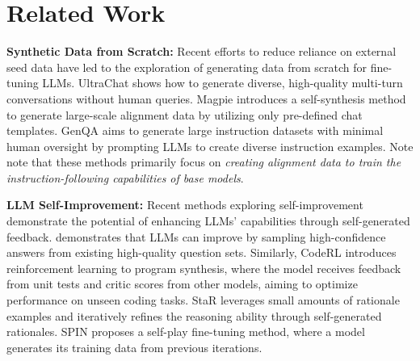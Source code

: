 \section{Related Work}\label{sec:related-work}

\textbf{Synthetic Data from Scratch:} Recent efforts to reduce reliance on external seed data have led to the exploration of generating data from scratch for fine-tuning LLMs. UltraChat \cite{DBLP:conf/emnlp/DingCXQHL0Z23} shows how to generate diverse, high-quality multi-turn conversations without human queries. Magpie \cite{DBLP:journals/corr/abs-2406-08464} introduces a self-synthesis method to generate large-scale alignment data by utilizing only pre-defined chat templates. GenQA \cite{DBLP:journals/corr/abs-2406-10323} aims to generate large instruction datasets with minimal human oversight by prompting LLMs to create diverse instruction examples. Note note that these methods primarily focus on \emph{creating alignment data to train the instruction-following capabilities of base models}.

\textbf{LLM Self-Improvement:} Recent methods exploring self-improvement demonstrate the potential of enhancing LLMs' capabilities through self-generated feedback. \citep{DBLP:conf/emnlp/0001GHW00023} demonstrates that LLMs can improve by sampling high-confidence answers from existing high-quality question sets. Similarly, CodeRL \cite{DBLP:conf/nips/Le0GSH22} introduces reinforcement learning to program synthesis, where the model receives feedback from unit tests and critic scores from other models, aiming to optimize performance on unseen coding tasks. StaR \cite{DBLP:conf/nips/ZelikmanWMG22} leverages small amounts of rationale examples and iteratively refines the reasoning ability through self-generated rationales. SPIN \cite{DBLP:conf/icml/ChenDYJG24} proposes a self-play fine-tuning method, where a model generates its training data from previous iterations.